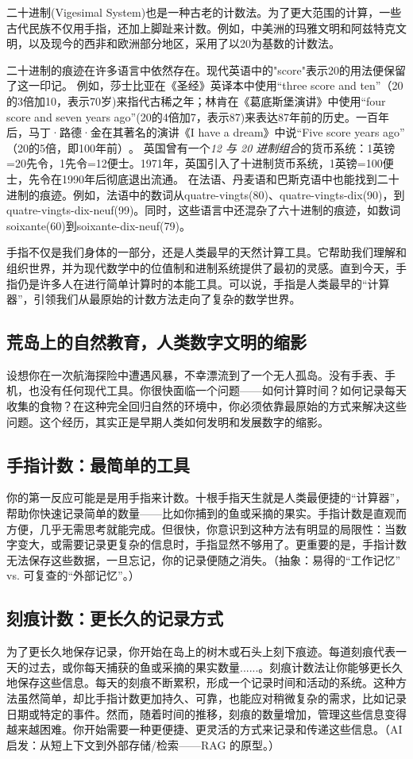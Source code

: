 二十进制(Vigesimal System)也是一种古老的计数法。为了更大范围的计算，一些古代民族不仅用手指，还加上脚趾来计数。例如，中美洲的玛雅文明和阿兹特克文明，以及现今的西非和欧洲部分地区，采用了以20为基数的计数法。

二十进制的痕迹在许多语言中依然存在。现代英语中的"score"表示20的用法便保留了这一印记。
例如，莎士比亚在《圣经》英译本中使用“three score and ten”（20的3倍加10，表示70岁)来指代古稀之年；林肯在《葛底斯堡演讲》中使用“four score and seven years ago”(20的4倍加7，表示87)来表达87年前的历史。一百年后，马丁·路德·金在其著名的演讲《I have a dream》中说“Five score years ago”​（20的5倍，即100年前）​。
英国曾有一个\emph{12 与 20 进制组合}的货币系统：1英镑=20先令，1先令=12便士。1971年，英国引入了十进制货币系统，1英镑=100便士，先令在1990年后彻底退出流通。
在法语、丹麦语和巴斯克语中也能找到二十进制的痕迹。例如，法语中的数词从quatre-vingts(80)​、quatre-vingts-dix(90)​，到quatre-vingts-dix-neuf(99)。同时，这些语言中还混杂了六十进制的痕迹，如数词soixante(60)到soixante-dix-neuf(79)。

手指不仅是我们身体的一部分，还是人类最早的天然计算工具。它帮助我们理解和组织世界，并为现代数学中的位值制和进制系统提供了最初的灵感。直到今天，手指仍是许多人在进行简单计算时的本能工具。可以说，手指是人类最早的“计算器”，引领我们从最原始的计数方法走向了复杂的数学世界。

\subsection{荒岛上的自然教育，人类数字文明的缩影}
设想你在一次航海探险中遭遇风暴，不幸漂流到了一个无人孤岛。没有手表、手机，也没有任何现代工具。你很快面临一个问题——如何计算时间？如何记录每天收集的食物？在这种完全回归自然的环境中，你必须依靠最原始的方式来解决这些问题。这个经历，其实正是早期人类如何发明和发展数字的缩影。

\subsection*{手指计数：最简单的工具}
你的第一反应可能是是用手指来计数。十根手指天生就是人类最便捷的“计算器”，帮助你快速记录简单的数量——比如你捕到的鱼或采摘的果实。手指计数是直观而方便，几乎无需思考就能完成。但很快，你意识到这种方法有明显的局限性：当数字变大，或需要记录更复杂的信息时，手指显然不够用了。更重要的是，手指计数无法保存这些数据，一旦忘记，你的记录便随之消失。{（抽象：易得的“工作记忆” vs. 可复查的“外部记忆”。）}

\subsection*{刻痕计数：更长久的记录方式}
为了更长久地保存记录，你开始在岛上的树木或石头上刻下痕迹。每道刻痕代表一天的过去，或你每天捕获的鱼或采摘的果实数量......。刻痕计数法让你能够更长久地保存这些信息。每天的刻痕不断累积，形成一个记录时间和活动的系统。这种方法虽然简单，却比手指计数更加持久、可靠，也能应对稍微复杂的需求，比如记录日期或特定的事件。然而，随着时间的推移，刻痕的数量增加，管理这些信息变得越来越困难。你开始需要一种更便捷、更灵活的方式来记录和传递这些信息。{（AI 启发：从短上下文到外部存储/检索——RAG 的原型。）}

